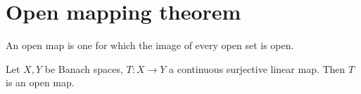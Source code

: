 \newpage
\section{Open mapping theorem}
\begin{definition}\rm
	An open map is one for which the image of every open set is open.
\end{definition}
\begin{theorem}\rm
	Let $X,Y$ be Banach spaces, $T:X\xrightarrow{}Y$ a continuous surjective linear map. Then $T$ is an open map.
\end{theorem}